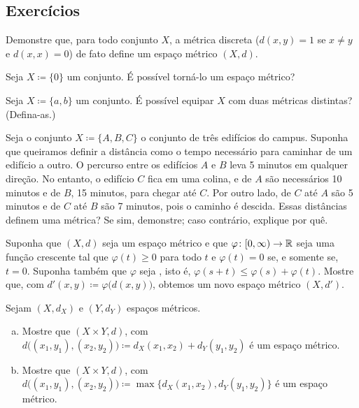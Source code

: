 \subsection{Exercícios}

\begin{exercise}
Demonstre que, para todo conjunto $X$, a métrica discreta ($d(x,y) = 1$ se
$x \neq y$ e $d(x,x) = 0$) de fato define um espaço métrico $(X,d)$.
\end{exercise}

\begin{exercise}
Seja $X \coloneqq \{ 0 \}$ um conjunto. É possível torná-lo um espaço métrico?
\end{exercise}

\begin{exercise}
Seja $X \coloneqq \{ a, b \}$ um conjunto. É possível equipar $X$ com duas métricas distintas? (Defina-as.)
\end{exercise}

\begin{exercise}
Seja o conjunto $X \coloneqq \{ A, B, C \}$ o conjunto de três edifícios do
campus. Suponha que queiramos definir a distância como o tempo necessário
para caminhar de um edifício a outro.
O percurso entre os edifícios $A$ e $B$ leva 5 minutos em qualquer direção.
No entanto, o edifício $C$ fica em uma colina, e de $A$ são necessários
10 minutos e de $B$, 15 minutos, para chegar até $C$. Por outro lado,
de $C$ até $A$ são 5 minutos e de $C$ até $B$ são 7 minutos, pois o caminho é
descida. Essas distâncias definem uma métrica? Se sim, demonstre; caso
contrário, explique por quê.
\end{exercise}

\begin{exercise}
Suponha que $(X,d)$ seja um espaço métrico e que
$\varphi \colon [0,\infty) \to {\mathbb{R}}$ seja uma função crescente tal que
$\varphi(t) \geq 0$ para todo $t$ e $\varphi(t) = 0$ se, e somente se,
$t=0$. Suponha também que $\varphi$ seja \emph{}, isto é,
$\varphi(s+t) \leq \varphi(s)+\varphi(t)$.
Mostre que, com $d'(x,y) \coloneqq \varphi\bigl(d(x,y)\bigr)$, obtemos um
novo espaço métrico $(X,d')$.
\end{exercise}

\begin{exercise} \label{exercise:mscross}
Sejam $(X,d_X)$ e $(Y,d_Y)$ espaços métricos.
\begin{enumerate}[a)]
\item
Mostre que $(X \times Y,d)$, com
$d\bigl( (x_1,y_1), (x_2,y_2) \bigr) \coloneqq d_X(x_1,x_2) + d_Y(y_1,y_2)$
é um espaço métrico.
\item
Mostre que $(X \times Y,d)$, com
$d\bigl( (x_1,y_1), (x_2,y_2) \bigr) \coloneqq \max \bigl\{ d_X(x_1,x_2) ,
d_Y(y_1,y_2) \bigr\}$
é um espaço métrico.
\end{enumerate}
\end{exercise}

